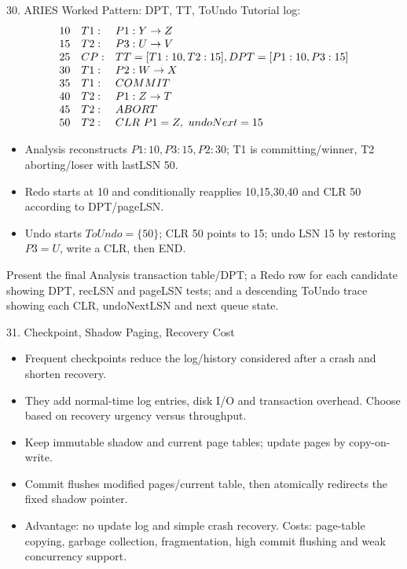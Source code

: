 \begin{topic}{30. ARIES Worked Pattern: DPT, TT, ToUndo}
\worked Tutorial log:
\[
\begin{array}{rll}
10&T1:&P1:Y\rightarrow Z\\
15&T2:&P3:U\rightarrow V\\
25&CP:&TT=[T1:10,T2:15],DPT=[P1:10,P3:15]\\
30&T1:&P2:W\rightarrow X\\
35&T1:&COMMIT\\
40&T2:&P1:Z\rightarrow T\\
45&T2:&ABORT\\
50&T2:&CLR\ P1=Z,\ undoNext=15
\end{array}
\]
\begin{itemize}
  \item Analysis reconstructs \(P1:10,P3:15,P2:30\); T1 is committing/winner, T2 aborting/loser with lastLSN 50.
  \item Redo starts at 10 and conditionally reapplies 10,15,30,40 and CLR 50 according to DPT/pageLSN.
  \item Undo starts \(ToUndo=\{50\}\); CLR 50 points to 15; undo LSN 15 by restoring \(P3=U\), write a CLR, then END.
\end{itemize}
\answer Present the final Analysis transaction table/DPT; a Redo row for each candidate showing DPT, recLSN and pageLSN tests; and a descending ToUndo trace showing each CLR, undoNextLSN and next queue state.
\end{topic}

\begin{topic}{31. Checkpoint, Shadow Paging, Recovery Cost}
\begin{itemize}
  \item Frequent checkpoints reduce the log/history considered after a crash and shorten recovery.
  \item They add normal-time log entries, disk I/O and transaction overhead. Choose based on recovery urgency versus throughput.
\end{itemize}
\begin{itemize}
  \item Keep immutable shadow and current page tables; update pages by copy-on-write.
  \item Commit flushes modified pages/current table, then atomically redirects the fixed shadow pointer.
  \item Advantage: no update log and simple crash recovery. Costs: page-table copying, garbage collection, fragmentation, high commit flushing and weak concurrency support.
\end{itemize}
\end{topic}

